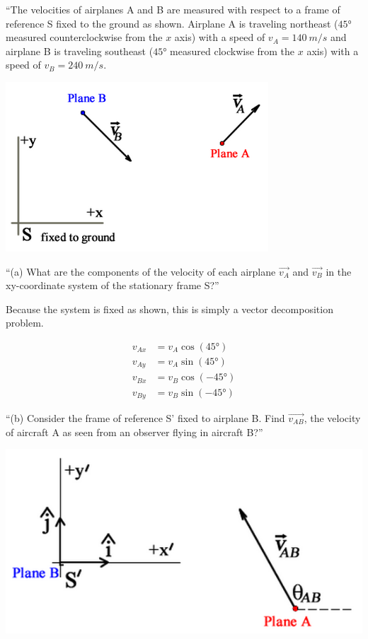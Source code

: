 \documentclass[12pt,a4paper]{report}
\begin{document}
``The velocities of airplanes A and B are measured with respect to a frame of reference S fixed to the ground as shown. Airplane A is traveling northeast ($\ang{45}$ measured counterclockwise from the $x$ axis) with a speed of $v_A = \SI{140}{m/s}$ and airplane B is traveling southeast ($\ang{45}$ measured clockwise from the $x$ axis) with a speed of $v_B = \SI{240}{m/s}$.

\begin{center}
\includegraphics[scale=0.7]{Graphics/h2p2_1}
\end{center}

``(a) What are the components of the velocity of each airplane $\vec{v_A}$ and $\vec{v_B}$ in the xy-coordinate system of the stationary frame S?''

Because the system is fixed as shown, this is simply a vector decomposition problem.

\begin{align}
v_{Ax} &= v_A \cos(\ang{45})\\
v_{Ay} &= v_A \sin(\ang{45})\\
v_{Bx} &= v_B \cos(-\ang{45})\\
v_{By} &= v_B \sin(-\ang{45})
\end{align}

``(b) Consider the frame of reference S' fixed to airplane B. Find $\vec{v_{AB}}$, the velocity of aircraft A as seen from an observer flying in aircraft B?''

\begin{center}
\includegraphics[scale=0.6]{Graphics/h2p2_2}
\end{center}
\end{document}
